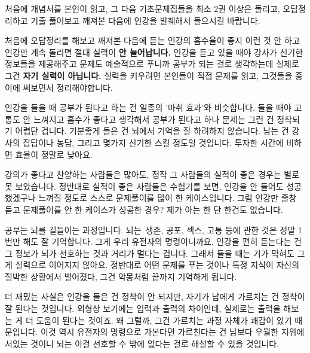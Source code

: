 \vspace{5mm}

처음에 개념서를 본인이 읽고, 그 다음 기초문제집들을 최소 2권 이상은 돌리고, 오답정리하고
기출 풀어보고 깨져본 다음에 인강을 발췌해서 들으시길 바랍니다.
\vspace{5mm}

처음에 오답정리를 해보고 깨져본 다음에 듣는 인강의 흡수율이 좋지
이런 것 안 하고 인강만 계속 돌리면 절대 실력이 \textbf{안 늘어납니다.}
인강을 듣고 있을 때야 강사가 신기한 정보들을 제공해주고 문제도 예술적으로 푸니까 공부가 되는 걸로 생각하는데
실제로 그건 \textbf{자기 실력이 아닙니다.}
실력을 키우려면 본인들이 직접 문제를 읽고, 그것들을 종이에 써보면서 정리해야합니다.
\vspace{5mm}

인강을 들을 때 공부가 된다고 하는 건 일종의 '마취 효과'와 비슷합니다.
들을 때야 고통도 안 느껴지고 흡수가 좋다고 생각해서 공부가 된다고 하나
문제는 그런 건 정착되기 어렵단 겁니다. 기분좋게 들은 건 뇌에서 기억을 잘 하려하지 않습니다.
남는 건 강사의 잡답이나 농담, 그리고 몇가지 신기한 스킬 정도일 것입니다. 투자한 시간에 비하면 효율이 정말로 낮아요.
\vspace{5mm}

강의가 좋다고 찬양하는 사람들은 많아도, 정작 그 사람들의 실적이 좋은 경우는 별로 못 보았습니다.
정반대로 실적이 좋은 사람들은 수험기를 보면, 인강을 안 들어도 성공했겠구나 느껴질 정도로 스스로 문제풀이를 많이 한 케이스입니다.
그럼 인강만 줄창 듣고 문제풀이를 안 한 케이스가 성공한 경우? 제가 아는 한 단 한건도 없습니다.
\vspace{5mm}

공부는 뇌를 길들이는 과정입니다.
뇌는 생존, 공포, 섹스, 고통 등에 관한 것은 정말 1번만 해도 잘 기억합니다. 그게 우리 유전자의 명령이니까요.
인강을 편히 듣는다는 건 그 정보가 뇌가 선호하는 것과 거리가 멀다는 겁니다. 그래서 들을 때는 기가 막혀도 그게 실력으로 이어지지 않아요.
정반대로 어떤 문제를 푸는 것이나 특정 지식이 자신의 절박한 상황에서 벌어졌다, 그건 악몽처럼 끝까지 기억하게 됩니다.
\vspace{5mm}

더 재밌는 사실은 인강을 들은 건 정착이 안 되지만, 자기가 남에게 가르치는 건 정착이 잘 된다는 것입니다.
외형상 보기에는 입력과 출력의 차이인데, 실제로는 출력을 해보는 게 더 도움이 된다는 것이죠.
왜 그럴까, 그건 가르치는 과정 자체가 쾌감이 있기 때문입니다. 이것 역시 유전자의 명령으로 가본다면
가르친다는 건 남보다 우월한 지위에 서있는 것이니 뇌는 이걸 선호할 수 밖에 없다는 걸로 해설할 수 있을 것입니다.
\vspace{5mm}






